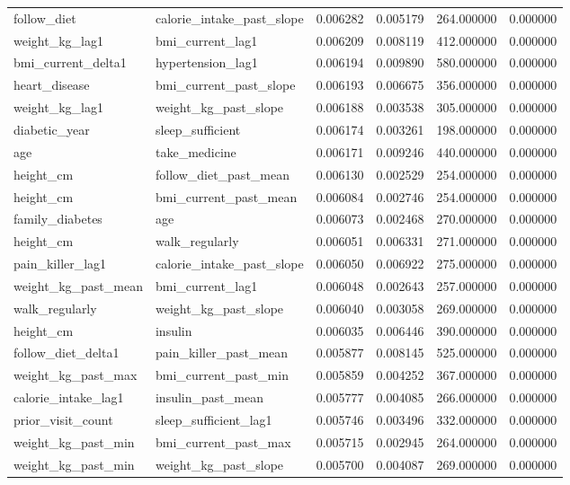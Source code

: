 \begin{longtable}{llrrrr}
follow\_diet & calorie\_intake\_past\_slope & 0.006282 & 0.005179 & 264.000000 & 0.000000 \\
weight\_kg\_lag1 & bmi\_current\_lag1 & 0.006209 & 0.008119 & 412.000000 & 0.000000 \\
bmi\_current\_delta1 & hypertension\_lag1 & 0.006194 & 0.009890 & 580.000000 & 0.000000 \\
heart\_disease & bmi\_current\_past\_slope & 0.006193 & 0.006675 & 356.000000 & 0.000000 \\
weight\_kg\_lag1 & weight\_kg\_past\_slope & 0.006188 & 0.003538 & 305.000000 & 0.000000 \\
diabetic\_year & sleep\_sufficient & 0.006174 & 0.003261 & 198.000000 & 0.000000 \\
age & take\_medicine & 0.006171 & 0.009246 & 440.000000 & 0.000000 \\
height\_cm & follow\_diet\_past\_mean & 0.006130 & 0.002529 & 254.000000 & 0.000000 \\
height\_cm & bmi\_current\_past\_mean & 0.006084 & 0.002746 & 254.000000 & 0.000000 \\
family\_diabetes & age & 0.006073 & 0.002468 & 270.000000 & 0.000000 \\
height\_cm & walk\_regularly & 0.006051 & 0.006331 & 271.000000 & 0.000000 \\
pain\_killer\_lag1 & calorie\_intake\_past\_slope & 0.006050 & 0.006922 & 275.000000 & 0.000000 \\
weight\_kg\_past\_mean & bmi\_current\_lag1 & 0.006048 & 0.002643 & 257.000000 & 0.000000 \\
walk\_regularly & weight\_kg\_past\_slope & 0.006040 & 0.003058 & 269.000000 & 0.000000 \\
height\_cm & insulin & 0.006035 & 0.006446 & 390.000000 & 0.000000 \\
follow\_diet\_delta1 & pain\_killer\_past\_mean & 0.005877 & 0.008145 & 525.000000 & 0.000000 \\
weight\_kg\_past\_max & bmi\_current\_past\_min & 0.005859 & 0.004252 & 367.000000 & 0.000000 \\
calorie\_intake\_lag1 & insulin\_past\_mean & 0.005777 & 0.004085 & 266.000000 & 0.000000 \\
prior\_visit\_count & sleep\_sufficient\_lag1 & 0.005746 & 0.003496 & 332.000000 & 0.000000 \\
weight\_kg\_past\_min & bmi\_current\_past\_max & 0.005715 & 0.002945 & 264.000000 & 0.000000 \\
weight\_kg\_past\_min & weight\_kg\_past\_slope & 0.005700 & 0.004087 & 269.000000 & 0.000000 \\

\end{longtable}
